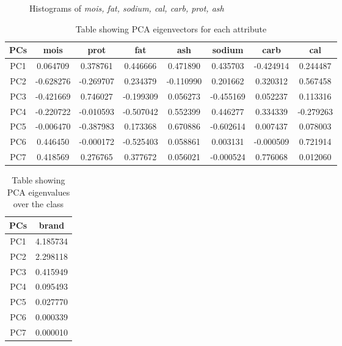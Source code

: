 \documentclass[preprint,12pt]{elsarticle}
\begin{document}
\begin{figure}[hb]
	
    \caption{Histograms of \textit{mois, fat, sodium, cal, carb, prot, ash}}
    \label{fig:brands_all.png}
\end{figure}


\begin{table}[h!]
\centering
\begin{tabular}{ |c| |c| |c| |c| |c| |c| |c| |c|}
\hline
 PCs & mois & prot & fat & ash & sodium & carb & cal \\ [0.2ex] 
 \hline
 PC1 & 0.064709 & 0.378761 & 0.446666 & 0.471890  & 0.435703 & -0.424914 & 0.244487 \\
 PC2 & -0.628276 & -0.269707 & 0.234379 & -0.110990  & 0.201662  & 0.320312  & 0.567458 \\
 PC3 & -0.421669 & 0.746027 & -0.199309 & 0.056273 & -0.455169 & 0.052237 & 0.113316 \\
 PC4 & -0.220722 & -0.010593 & -0.507042 & 0.552399 & 0.446277 & 0.334339 & -0.279263 \\
 PC5 & -0.006470 & -0.387983 & 0.173368 & 0.670886 & -0.602614 & 0.007437 & 0.078003 \\
 PC6 & 0.446450 & -0.000172 & -0.525403 & 0.058861 & 0.003131 & -0.000509 & 0.721914 \\
 PC7 & 0.418569 & 0.276765 & 0.377672 & 0.056021 & -0.000524 & 0.776068 & 0.012060 \\ [1ex]
  \hline\hline
\end{tabular}
\caption{Table showing PCA eigenvectors for each attribute}\label{table:eigenvectors}
\end{table}

\begin{table}[h!]
\centering
\begin{tabular}{ |c| |c| }
\hline
 PCs & brand\\ [0.2ex] 
 \hline
PC1 & 4.185734 \\
PC2 & 2.298118 \\
PC3 & 0.415949 \\
PC4 & 0.095493 \\
PC5 & 0.027770 \\ 
PC6 & 0.000339 \\
PC7 & 0.000010 \\
  \hline\hline
\end{tabular}
\caption{Table showing PCA eigenvalues over the class}\label{table:eigenvalues}
\end{table}
\end{document}
